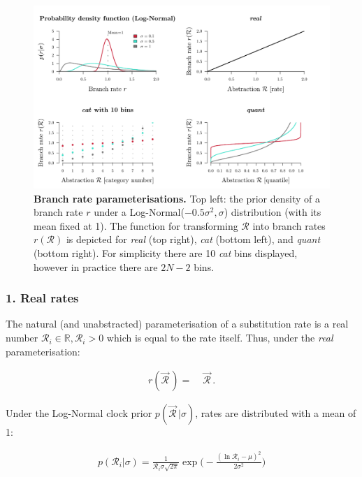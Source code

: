 \documentclass[10pt,letterpaper]{article}
\begin{document}
\begin{figure}[!h]
\includegraphics[width=\textwidth]{Figures/rateparameterisation.pdf}
\caption{\textbf{Branch rate parameterisations.} Top left: the prior density of a branch rate $r$ under a Log-Normal($-0.5\sigma^2, \sigma$) distribution (with its mean fixed at 1). 
The function for transforming $\mathcal{R}$ into branch rates $r(\mathcal{R})$ is depicted for \textit{real} (top right), \textit{cat} (bottom left), and \textit{quant} (bottom right).
For simplicity there are 10 \textit{cat} bins displayed, however in practice there are $2N-2$ bins. }
\label{fig:rateparams}
\end{figure}



\clearpage
\subsubsection*{1. Real rates}
The natural (and unabstracted) parameterisation of a substitution rate is a real number $\mathcal{R}_i \in \mathbb{R}, \mathcal{R}_i > 0$ which is equal to the rate itself. Thus, under the \textit{real} parameterisation:

\begin{align}
r(\vec{\mathcal{R}}^{\,}) =& \; \vec{\mathcal{R}}^{\,}.
\end{align}


Under the Log-Normal clock prior $p(\vec{\mathcal{R}}^{\,} | \sigma)$, rates are distributed with a mean of 1:

\begin{align}
p(\mathcal{R}_i | \sigma) = \frac{1}{\mathcal{R}_i \sigma \sqrt{2\pi}} \exp \big( -\frac{(\ln \mathcal{R}_i - \mu)^2}{2\sigma^2} \big) 
\end{align}
\end{document}
